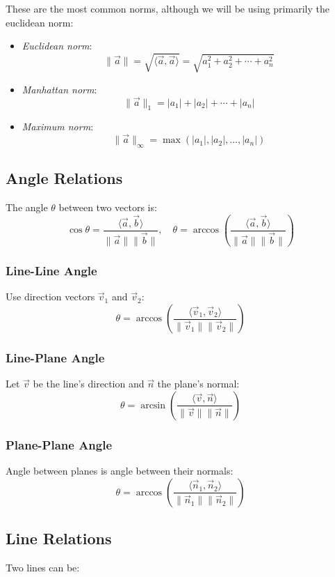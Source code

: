 These are the most common norms, although we will be using primarily the euclidean norm:

\begin{itemize}[label=\(-\)]
	\item \emph{Euclidean norm}:
	      \[
		      \|\vec{a}\| = \sqrt{\langle\vec{a}, \vec{a}\rangle} = \sqrt{a_1^2 + a_2^2 + \cdots + a_n^2}
	      \]
	\item \emph{Manhattan norm}:
	      \[
		      \|\vec{a}\|_1 = |a_1| + |a_2| + \cdots + |a_n|
	      \]
	\item \emph{Maximum norm}:
	      \[
		      \|\vec{a}\|_\infty = \max(|a_1|, |a_2|, \dots , |a_n|)
	      \]
\end{itemize}

\subsection{Angle Relations}
The angle \(\theta\) between two vectors is:
\[
	\cos\theta = \frac{\langle\vec{a}, \vec{b}\rangle}{\|\vec{a}\|\|\vec{b}\|}, \quad \theta = \arccos\left( \frac{\langle\vec{a}, \vec{b}\rangle}{\|\vec{a}\|\|\vec{b}\|} \right)
\]

\subsubsection{Line-Line Angle}

Use direction vectors \(\vec{v}_1\) and \(\vec{v}_2\):
\[
	\theta = \arccos\left( \frac{\langle\vec{v}_1, \vec{v}_2\rangle}{\|\vec{v}_1\|\|\vec{v}_2\|} \right)
\]

\subsubsection{Line-Plane Angle}

Let \(\vec{v}\) be the line's direction and \(\vec{n}\) the plane's normal:
\[
	\theta = \arcsin\left( \frac{\langle\vec{v}, \vec{n}\rangle}{\|\vec{v}\|\|\vec{n}\|} \right)
\]

\subsubsection{Plane-Plane Angle}

Angle between planes is angle between their normals:
\[
	\theta = \arccos\left( \frac{\langle\vec{n}_1, \vec{n}_2\rangle}{\|\vec{n}_1\|\|\vec{n}_2\|} \right)
\]

\subsection{Line Relations}
Two lines can be:

